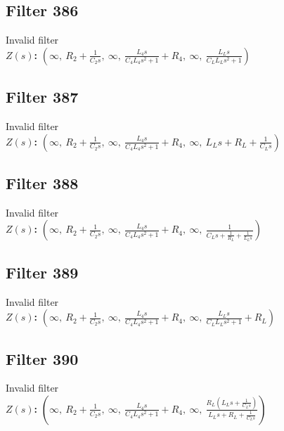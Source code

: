 \documentclass{article}
\begin{document}
\subsection*{Filter 386}
Invalid filter \\ 
\textbf{$Z(s)$:} $\left( \infty, \  R_{2} + \frac{1}{C_{2} s}, \  \infty, \  \frac{L_{4} s}{C_{4} L_{4} s^{2} + 1} + R_{4}, \  \infty, \  \frac{L_{L} s}{C_{L} L_{L} s^{2} + 1}\right)$ \\ 
\subsection*{Filter 387}
Invalid filter \\ 
\textbf{$Z(s)$:} $\left( \infty, \  R_{2} + \frac{1}{C_{2} s}, \  \infty, \  \frac{L_{4} s}{C_{4} L_{4} s^{2} + 1} + R_{4}, \  \infty, \  L_{L} s + R_{L} + \frac{1}{C_{L} s}\right)$ \\ 
\subsection*{Filter 388}
Invalid filter \\ 
\textbf{$Z(s)$:} $\left( \infty, \  R_{2} + \frac{1}{C_{2} s}, \  \infty, \  \frac{L_{4} s}{C_{4} L_{4} s^{2} + 1} + R_{4}, \  \infty, \  \frac{1}{C_{L} s + \frac{1}{R_{L}} + \frac{1}{L_{L} s}}\right)$ \\ 
\subsection*{Filter 389}
Invalid filter \\ 
\textbf{$Z(s)$:} $\left( \infty, \  R_{2} + \frac{1}{C_{2} s}, \  \infty, \  \frac{L_{4} s}{C_{4} L_{4} s^{2} + 1} + R_{4}, \  \infty, \  \frac{L_{L} s}{C_{L} L_{L} s^{2} + 1} + R_{L}\right)$ \\ 
\subsection*{Filter 390}
Invalid filter \\ 
\textbf{$Z(s)$:} $\left( \infty, \  R_{2} + \frac{1}{C_{2} s}, \  \infty, \  \frac{L_{4} s}{C_{4} L_{4} s^{2} + 1} + R_{4}, \  \infty, \  \frac{R_{L} \left(L_{L} s + \frac{1}{C_{L} s}\right)}{L_{L} s + R_{L} + \frac{1}{C_{L} s}}\right)$ \\ 
\end{document}
